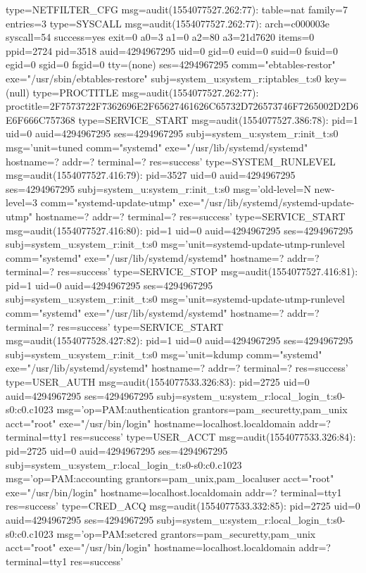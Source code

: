 \documentclass[]{report}
\newenvironment{Shaded}{}{}
\newcommand{\NormalTok}[1]{#1}
\begin{document}
\begin{Shaded}
\begin{Highlighting}[]
\NormalTok{type=NETFILTER_CFG msg=audit(1554077527.262:77): table=nat family=7 entries=3}
\NormalTok{type=SYSCALL msg=audit(1554077527.262:77): arch=c000003e syscall=54 success=yes exit=0 a0=3 a1=0 a2=80 a3=21d7620 items=0 ppid=2724 pid=3518 auid=4294967295 uid=0 gid=0 euid=0 suid=0 fsuid=0 egid=0 sgid=0 fsgid=0 tty=(none) ses=4294967295 comm="ebtables-restor" exe="/usr/sbin/ebtables-restore" subj=system_u:system_r:iptables_t:s0 key=(null)}
\NormalTok{type=PROCTITLE msg=audit(1554077527.262:77): proctitle=2F7573722F7362696E2F65627461626C65732D726573746F7265002D2D6E6F666C757368}
\NormalTok{type=SERVICE_START msg=audit(1554077527.386:78): pid=1 uid=0 auid=4294967295 ses=4294967295 subj=system_u:system_r:init_t:s0 msg='unit=tuned comm="systemd" exe="/usr/lib/systemd/systemd" hostname=? addr=? terminal=? res=success'}
\NormalTok{type=SYSTEM_RUNLEVEL msg=audit(1554077527.416:79): pid=3527 uid=0 auid=4294967295 ses=4294967295 subj=system_u:system_r:init_t:s0 msg='old-level=N new-level=3 comm="systemd-update-utmp" exe="/usr/lib/systemd/systemd-update-utmp" hostname=? addr=? terminal=? res=success'}
\NormalTok{type=SERVICE_START msg=audit(1554077527.416:80): pid=1 uid=0 auid=4294967295 ses=4294967295 subj=system_u:system_r:init_t:s0 msg='unit=systemd-update-utmp-runlevel comm="systemd" exe="/usr/lib/systemd/systemd" hostname=? addr=? terminal=? res=success'}
\NormalTok{type=SERVICE_STOP msg=audit(1554077527.416:81): pid=1 uid=0 auid=4294967295 ses=4294967295 subj=system_u:system_r:init_t:s0 msg='unit=systemd-update-utmp-runlevel comm="systemd" exe="/usr/lib/systemd/systemd" hostname=? addr=? terminal=? res=success'}
\NormalTok{type=SERVICE_START msg=audit(1554077528.427:82): pid=1 uid=0 auid=4294967295 ses=4294967295 subj=system_u:system_r:init_t:s0 msg='unit=kdump comm="systemd" exe="/usr/lib/systemd/systemd" hostname=? addr=? terminal=? res=success'}
\NormalTok{type=USER_AUTH msg=audit(1554077533.326:83): pid=2725 uid=0 auid=4294967295 ses=4294967295 subj=system_u:system_r:local_login_t:s0-s0:c0.c1023 msg='op=PAM:authentication grantors=pam_securetty,pam_unix acct="root" exe="/usr/bin/login" hostname=localhost.localdomain addr=? terminal=tty1 res=success'}
\NormalTok{type=USER_ACCT msg=audit(1554077533.326:84): pid=2725 uid=0 auid=4294967295 ses=4294967295 subj=system_u:system_r:local_login_t:s0-s0:c0.c1023 msg='op=PAM:accounting grantors=pam_unix,pam_localuser acct="root" exe="/usr/bin/login" hostname=localhost.localdomain addr=? terminal=tty1 res=success'}
\NormalTok{type=CRED_ACQ msg=audit(1554077533.332:85): pid=2725 uid=0 auid=4294967295 ses=4294967295 subj=system_u:system_r:local_login_t:s0-s0:c0.c1023 msg='op=PAM:setcred grantors=pam_securetty,pam_unix acct="root" exe="/usr/bin/login" hostname=localhost.localdomain addr=? terminal=tty1 res=success'}

\end{Highlighting}
\end{Shaded}
\end{document}
